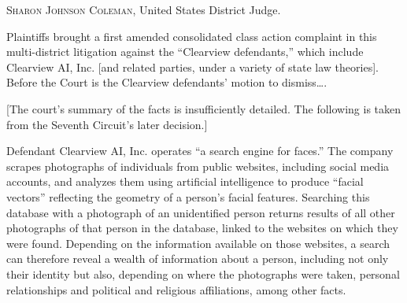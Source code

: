 


\opinion \textsc{Sharon Johnson Coleman}, United States District Judge.

Plaintiffs brought a first amended consolidated class action 
complaint in this multi-district litigation against the ``Clearview 
defendants,'' which include Clearview AI, Inc.
[and related parties, under a variety of state law theories].
Before 
the Court is the Clearview defendants' motion to dismiss\ldots.







[The court's summary of the facts is insufficiently detailed. The following is
taken from the Seventh Circuit's later decision.]

Defendant Clearview AI, Inc. operates ``a search engine for faces.'' The company
scrapes photographs of individuals from public websites, including social media
accounts, and analyzes them using artificial intelligence to produce ``facial
vectors'' reflecting the geometry of a person's facial features. Searching this
database with a photograph of an unidentified person returns results of all
other photographs of that person in the database, linked to the websites on
which they were found. Depending on the information available on those websites,
a search can therefore reveal a wealth of information about a person, including
not only their identity but also, depending on where the photographs were taken,
personal relationships and political and religious affiliations, among other
facts.

